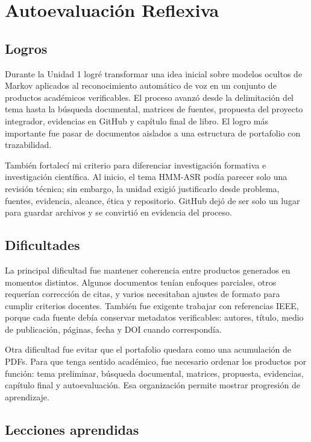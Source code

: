 \documentclass[11pt,a4paper]{article}
\begin{document}
\section{Autoevaluación Reflexiva}

\subsection{Logros}

Durante la Unidad 1 logré transformar una idea inicial sobre modelos ocultos de Markov aplicados al reconocimiento automático de voz en un conjunto de productos académicos verificables. El proceso avanzó desde la delimitación del tema hasta la búsqueda documental, matrices de fuentes, propuesta del proyecto integrador, evidencias en GitHub y capítulo final de libro. El logro más importante fue pasar de documentos aislados a una estructura de portafolio con trazabilidad.

También fortalecí mi criterio para diferenciar investigación formativa e investigación científica. Al inicio, el tema HMM-ASR podía parecer solo una revisión técnica; sin embargo, la unidad exigió justificarlo desde problema, fuentes, evidencia, alcance, ética y repositorio. GitHub dejó de ser solo un lugar para guardar archivos y se convirtió en evidencia del proceso.

\subsection{Dificultades}

La principal dificultad fue mantener coherencia entre productos generados en momentos distintos. Algunos documentos tenían enfoques parciales, otros requerían corrección de citas, y varios necesitaban ajustes de formato para cumplir criterios docentes. También fue exigente trabajar con referencias IEEE, porque cada fuente debía conservar metadatos verificables: autores, título, medio de publicación, páginas, fecha y DOI cuando correspondía.

Otra dificultad fue evitar que el portafolio quedara como una acumulación de PDFs. Para que tenga sentido académico, fue necesario ordenar los productos por función: tema preliminar, búsqueda documental, matrices, propuesta, evidencias, capítulo final y autoevaluación. Esa organización permite mostrar progresión de aprendizaje.

\subsection{Lecciones aprendidas}
\end{document}
